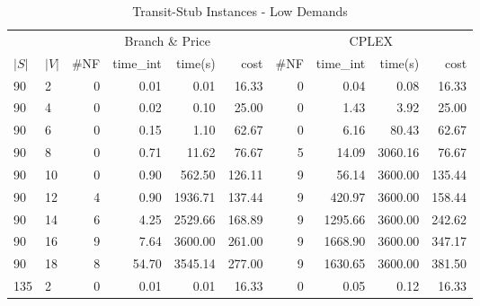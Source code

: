 \begin{appendices}
\begin{table*}[h]
\scriptsize
\begin{center}
\caption{Transit-Stub Instances - Low Demands}
\begin{tabular} {l l | r r r r | r r r r}
\hline
       &                                 &  \multicolumn{4}{c|}{Branch \& Price}                                & \multicolumn{4}{c}{CPLEX}                 \\
 $|S|$ & $|V|$                           &  \#NF  & time\_int     &  time(s)      &  cost            &  \#NF   &  time\_int   &  time(s)       &  cost       \\ 
\hline
90 & 2                              &  0                 &  0.01          &  0.01       &  16.33       &  0          &  0.04            &  0.08       &  16.33     \\ 
90 & 4                              &  0                 &  0.02          &  0.10       &  25.00       &  0          &  1.43            &  3.92       &  25.00     \\ 
90 & 6                              &  0                 &  0.15          &  1.10       &  62.67       &  0          &  6.16            &  80.43      &  62.67     \\ 
90 & 8                              &  0                 &  0.71          &  11.62      &  76.67       &  5          &  14.09           &  3060.16    &  76.67     \\ 
90 & 10                             &  0                 &  0.90          &  562.50     &  126.11      &  9          &  56.14           &  3600.00    &  135.44    \\ 
90 & 12                             &  4                 &  0.90          &  1936.71    &  137.44      &  9          &  420.97          &  3600.00    &  158.44    \\ 
90 & 14                             &  6                 &  4.25          &  2529.66    &  168.89      &  9          &  1295.66         &  3600.00    &  242.62    \\ 
90 & 16                             &  9                 &  7.64          &  3600.00    &  261.00      &  9          &  1668.90         &  3600.00    &  347.17    \\ 
90 & 18                             &  8                 &  54.70         &  3545.14    &  277.00      &  9          &  1630.65         &  3600.00    &  381.50    \\ 
135 & 2                             &  0                 &  0.01          &  0.01       &  16.33       &  0          &  0.05            &  0.12       &  16.33     \\ 

\end{tabular}
\end{center}
\end{table*}
\end{appendices}
